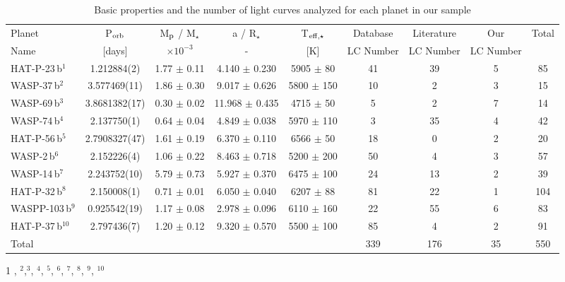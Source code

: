 \documentclass[a4paper,fleqn,usenatbib]{mnras}
\begin{document}
\begin{table*}
\centering
	\caption{Basic properties and the number of light curves analyzed for each planet in our sample}
	\label{tab:planetdata}
        \begin{threeparttable}
	\begin{tabular}{lcccccccc} 
		\hline
		Planet & P$_{\rm orb}$ & M$_{\rm p}$ / M$_{\star}$ & a / R$_{\star}$  & T$_{\rm eff,\star}$ & Database & Literature & Our & Total \\
                Name & [days] & $\times 10^{-3}$ & - & [K] & LC Number & LC Number & LC Number & \\ 
		\hline
		HAT-P-23\,b$^1$ & 1.212884(2) & 1.77 $\pm$ 0.11 & 4.140 $\pm$ 0.230 & 5905 $\pm$ 80 & 41 & 39 & 5 & 85 \\
                WASP-37\,b$^2$  & 3.577469(11) & 1.86 $\pm$ 0.30 & 9.017 $\pm$ 0.626 & 5800 $\pm$ 150 & 10 & 2 & 3 & 15 \\
                WASP-69\,b$^3$  & 3.8681382(17) & 0.30 $\pm$ 0.02 & 11.968 $\pm$ 0.435 & 4715 $\pm$ 50  & 5 & 2 & 7 & 14 \\
                WASP-74\,b$^4$  & 2.137750(1) & 0.64 $\pm$ 0.04 & 4.849 $\pm$ 0.038 & 5970 $\pm$ 110 & 3 & 35 & 4 & 42 \\
                HAT-P-56\,b$^5$  & 2.7908327(47) & 1.61 $\pm$ 0.19 & 6.370 $\pm$ 0.110 & 6566 $\pm$ 50  & 18 & 0 & 2 & 20 \\
                WASP-2\,b$^6$  & 2.152226(4) & 1.06 $\pm$ 0.22 & 8.463 $\pm$ 0.718  & 5200 $\pm$ 200 & 50 & 4 & 3 & 57 \\
                WASP-14\,b$^7$  & 2.243752(10) & 5.79 $\pm$ 0.73 & 5.927 $\pm$ 0.370  & 6475 $\pm$ 100 & 24 & 13 & 2 & 39 \\
                HAT-P-32\,b$^{8}$  & 2.150008(1) & 0.71 $\pm$ 0.01 & 6.050 $\pm$ 0.040  & 6207 $\pm$ 88 & 81 & 22 & 1 & 104 \\
                WASPP-103\,b$^{9}$  & 0.925542(19) & 1.17 $\pm$ 0.08 & 2.978 $\pm$ 0.096  & 6110 $\pm$ 160 & 22 & 55 & 6 & 83 \\
                HAT-P-37\,b$^{10}$ & 2.797436(7) & 1.20 $\pm$ 0.12 & 9.320 $\pm$ 0.570 & 5500 $\pm$ 100 & 85 & 4 & 2 & 91 \\
                \hline
                Total & & & & & 339 & 176 & 35 & 550 \\ 
		\hline
	\end{tabular}
        \begin{tablenotes}
          \footnotesize{
        \item[1] \citet{2011ApJ...742..116B}, $^2$\citet{2011AJ....141....8S},$^3$\citet{2014MNRAS.445.1114A}, $^4$\citet{2015AJ....150...18H}, $^5$\citet{2015AJ....150...85H},  $^6$\citet{2007MNRAS.375..951C}, $^7$\citet{2009MNRAS.392.1532J}, $^{8}$\citet{2011ApJ...742...59H}, $^{9}$\citet{2014A&A...562L...3G}, $^{10}$\citet{2012AJ....144...19B}
          }
        \end{tablenotes}
        \end{threeparttable}
\end{table*}
\end{document}
